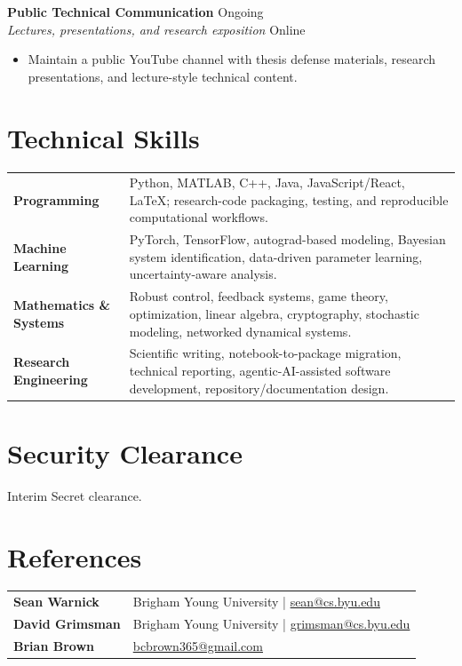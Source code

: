\documentclass[10pt,letterpaper]{article}
\newcommand{\entry}[4]{%
  \textbf{#1} \hfill {\color{muted}#2}\\
  \emph{#3} \hfill {\color{muted}#4}\\[-0.2em]
}
\begin{document}
\entry{Public Technical Communication}{Ongoing}{Lectures, presentations, and research exposition}{Online}
\begin{itemize}
    \item Maintain a public YouTube channel with thesis defense materials, research presentations, and lecture-style technical content.
\end{itemize}

\section{Technical Skills}
\begin{tabularx}{\textwidth}{>{\bfseries}p{1.55in}X}
Programming & Python, MATLAB, C++, Java, JavaScript/React, \LaTeX; research-code packaging, testing, and reproducible computational workflows.\\
Machine Learning & PyTorch, TensorFlow, autograd-based modeling, Bayesian system identification, data-driven parameter learning, uncertainty-aware analysis.\\
Mathematics \& Systems & Robust control, feedback systems, game theory, optimization, linear algebra, cryptography, stochastic modeling, networked dynamical systems.\\
Research Engineering & Scientific writing, notebook-to-package migration, technical reporting, agentic-AI-assisted software development, repository/documentation design.\\
\end{tabularx}

\section{Security Clearance}
Interim Secret clearance.

\section{References}
\begin{tabularx}{\textwidth}{>{\bfseries}p{1.65in}X}
Sean Warnick & Brigham Young University \;|\; \href{mailto:sean@cs.byu.edu}{sean@cs.byu.edu}\\
David Grimsman & Brigham Young University \;|\; \href{mailto:grimsman@cs.byu.edu}{grimsman@cs.byu.edu}\\
Brian Brown & \href{mailto:bcbrown365@gmail.com}{bcbrown365@gmail.com}\\
\end{tabularx}
\end{document}
